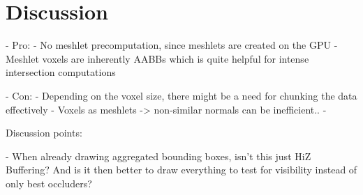 \chapter{Discussion} \label{cpt-discussion}


- Pro: 
    - No meshlet precomputation, since meshlets are created on the GPU
    - Meshlet voxels are inherently AABBs which is quite helpful for intense intersection computations %

- Con:
    - Depending on the voxel size, there might be a need for chunking the data effectively %
    - Voxels as meshlets -> non-similar normals can be inefficient.. 
    - 


Discussion points:

- When already drawing aggregated bounding boxes, isn't this just HiZ Buffering? And is it then better to draw everything
 to test for visibility instead of only best occluders? 